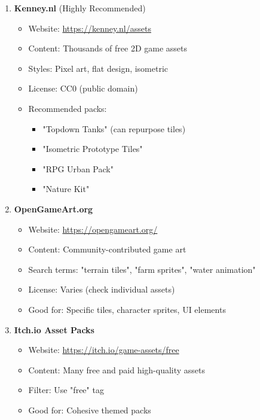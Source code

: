 \documentclass[12pt,a4paper]{article}
\begin{document}
\begin{enumerate}
    \item \textbf{Kenney.nl} (Highly Recommended)
    \begin{itemize}
        \item Website: \url{https://kenney.nl/assets}
        \item Content: Thousands of free 2D game assets
        \item Styles: Pixel art, flat design, isometric
        \item License: CC0 (public domain)
        \item Recommended packs:
        \begin{itemize}
            \item "Topdown Tanks" (can repurpose tiles)
            \item "Isometric Prototype Tiles"
            \item "RPG Urban Pack"
            \item "Nature Kit"
        \end{itemize}
    \end{itemize}
    
    \item \textbf{OpenGameArt.org}
    \begin{itemize}
        \item Website: \url{https://opengameart.org/}
        \item Content: Community-contributed game art
        \item Search terms: "terrain tiles", "farm sprites", "water animation"
        \item License: Varies (check individual assets)
        \item Good for: Specific tiles, character sprites, UI elements
    \end{itemize}
    
    \item \textbf{Itch.io Asset Packs}
    \begin{itemize}
        \item Website: \url{https://itch.io/game-assets/free}
        \item Content: Many free and paid high-quality assets
        \item Filter: Use "free" tag
        \item Good for: Cohesive themed packs
    \end{itemize}
\end{enumerate}
\end{document}

